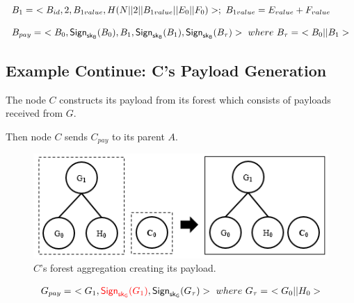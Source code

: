 \documentclass[%
  slidesonly,%
  semlayer%
  ]{seminar}                                  %
\newcommand{\sk}{\sf{sk}}
\begin{document}
\begin{slide}
      
      \begin{tiny}
        \begin{equation*}
          \begin{array}{l}
            B_{1} =\ < B_{id}, 2, B_{1value}, H(N||2||B_{1value}||E_{0}||F_{0})>;\ B_{1value} = E_{value} + F_{value}\\
            \\
            B_{pay} =\ < B_{0}, \textsf{Sign}_{\sk_{B}}(B_{0}), B_{1}, \textsf{Sign}_{\sk_{B}}(B_{1}), \textsf{Sign}_{\sk_{B}}(B_{\tau}) >\ where\ B_{\tau} =\ <B_{0} || B_{1}>\\
          \end{array}
          \label{eq:b-payload}
        \end{equation*}
      \end{tiny}


      \vfill
      \clearpage
    
    \subsection*{Example Continue: C's Payload Generation}  
      The node $C$ constructs its payload from its forest which consists of payloads received from $G$.

      Then node $C$ sends $C_{pay}$ to its parent $A$.

      \begin{figure}[h!]
        \centering
        \includegraphics[scale = 0.5]{images/c-forest-payload.png}
        \caption{$C$'s forest aggregation creating its payload.}
        \label{fig:c-forest-payload}
      \end{figure}
      \begin{equation*}
        \begin{array}{l}
          G_{pay} =\ <G_{1},\textcolor{red}{\textsf{Sign}_{\sk_{G}}(G_{1})}, \textsf{Sign}_{\sk_{G}}(G_{\tau})>\ where\ G_{\tau} =\ <G_{0} || H_{0}>\\
        \end{array}
      \end{equation*}
      

\end{slide}
\end{document}
